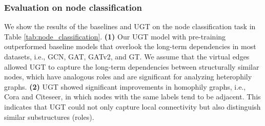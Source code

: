 \documentclass[oneside]{article}
\begin{document}
\subsubsection{Evaluation on node classification}

We show the results of the baselines and UGT on the node classification task in Table \ref{tab:node_classification}.
\textbf{(1)} Our UGT model with pre-training outperformed baseline models that overlook the long-term dependencies in most datasets, i.e., GCN, GAT, GATv2, and GT.
We assume that the virtual edges allowed UGT to capture the long-term dependencies between structurally similar nodes, which have analogous roles and are significant for analyzing heterophily graphs.
\textbf{(2)}  UGT showed significant improvements in homophily graphs, i.e., Cora and Citeseer, in which nodes with the same labels tend to be adjacent.
This indicates that UGT could not only capture local connectivity but also distinguish similar substructures (roles).


































    




    




    




    




    


    




 




    




    
\end{document}
